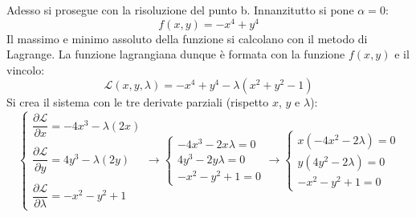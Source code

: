 \documentclass[a4paper]{article}
\begin{document}
	Adesso si prosegue con la risoluzione del punto b. Innanzitutto si pone $\alpha = 0$:
	\begin{equation*}
		f\left(x,y\right) = -x^{4} + y^{4}
	\end{equation*}
	Il massimo e minimo assoluto della funzione si calcolano con il metodo di Lagrange. La funzione lagrangiana dunque è formata con la funzione $f\left(x,y\right)$ e il vincolo:
	\begin{equation*}
		\mathcal{L}\left(x,y,\lambda\right) = -x^{4} + y^{4} - \lambda\left(x^{2} + y^{2} - 1\right)
	\end{equation*}
	Si crea il sistema con le tre derivate parziali (rispetto $x$, $y$ e $\lambda$):
	\begin{equation*}
		\begin{cases}
			\dfrac{\partial \mathcal{L}}{\partial x} = - 4x^{3} - \lambda\left(2x\right)\\
			\\
			\dfrac{\partial \mathcal{L}}{\partial y} = 4y^{3} - \lambda\left(2y\right) \\
			\\
			\dfrac{\partial \mathcal{L}}{\partial \lambda} = - x^{2} - y^{2} + 1
		\end{cases}
		\longrightarrow
		\begin{cases}
			- 4x^{3} - 2x \lambda = 0 \\
			4y^{3} - 2y \lambda = 0 \\
			- x^{2} - y^{2} + 1 = 0
		\end{cases}
		\longrightarrow
		\begin{cases}
			x\left(-4x^{2} - 2\lambda\right) = 0 \\
			y\left(4y^{2} - 2 \lambda\right) = 0 \\
			- x^{2} - y^{2} + 1 = 0
		\end{cases}
	\end{equation*}\newpage
\end{document}
